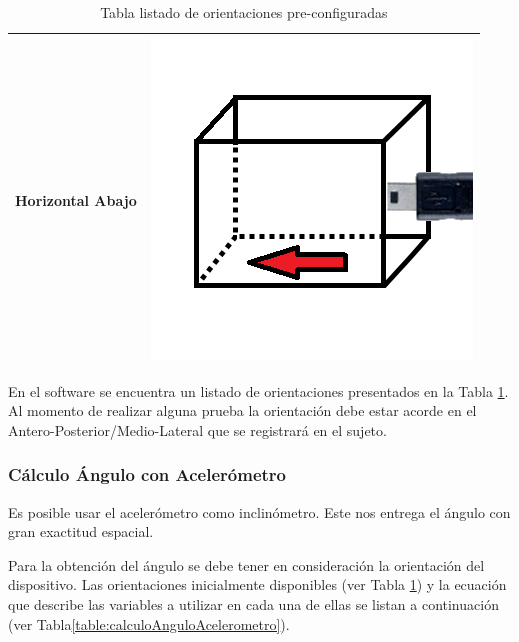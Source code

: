 \documentclass[12pt,a4paper]{article}
\begin{document}
\begin{table}[H]
\begin{tabular}{|c|c|}
		\hline 
		Horizontal Abajo &  \includegraphics[scale=0.2]{images/IMU/horizontalabajo}   \\ 
		\hline 
	\end{tabular}
	\caption{Tabla listado de orientaciones pre-configuradas}
	\label{table:listadoOrientaciones}
\end{table}

En el software se encuentra un listado de orientaciones presentados en la Tabla \ref{table:listadoOrientaciones}.
Al momento de realizar alguna prueba la orientación debe estar acorde en el Antero-Posterior/Medio-Lateral que se registrará en el sujeto.

\newpage
\subsubsection{Cálculo Ángulo con Acelerómetro} Es posible usar el acelerómetro como inclinómetro. Este nos entrega el ángulo con gran exactitud espacial.

Para la obtención del ángulo se debe tener en consideración la orientación del dispositivo. Las orientaciones inicialmente disponibles (ver Tabla \ref{table:listadoOrientaciones}) y la ecuación que describe las variables a utilizar en cada una de ellas se listan a continuación (ver Tabla\ref{table:calculoAnguloAcelerometro}).
\end{document}
